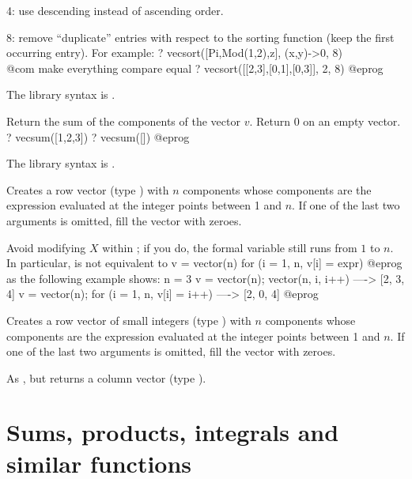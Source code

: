 \item 4: use descending instead of ascending order.

\item 8: remove ``duplicate'' entries with respect to the sorting function
(keep the first occurring entry).  For example:
\bprog
  ? vecsort([Pi,Mod(1,2),z], (x,y)->0, 8)   \\@com make everything compare equal
  ? vecsort([[2,3],[0,1],[0,3]], 2, 8)
@eprog

The library syntax is .

\label{se:vecsum}
Return the sum of the components of the vector $v$. Return $0$ on an
empty vector.
\bprog
? vecsum([1,2,3])
? vecsum([])
@eprog

The library syntax is .

\label{se:vector}
Creates a row vector (type
) with $n$ components whose components are the expression
 evaluated at the integer points between 1 and $n$. If one of the
last two arguments is omitted, fill the vector with zeroes.

Avoid modifying $X$ within ; if you do, the formal variable
still runs from $1$ to $n$. In particular,  is not
equivalent to
\bprog
v = vector(n)
for (i = 1, n, v[i] = expr)
@eprog\noindent
as the following example shows:
\bprog
n = 3
v = vector(n); vector(n, i, i++)            ----> [2, 3, 4]
v = vector(n); for (i = 1, n, v[i] = i++)   ----> [2, 0, 4]
@eprog\noindent

\label{se:vectorsmall}
Creates a row vector of small integers (type
) with $n$ components whose components are the expression
 evaluated at the integer points between 1 and $n$. If one of the
last two arguments is omitted, fill the vector with zeroes.

\label{se:vectorv}
As , but returns a column vector (type ).

\section{Sums, products, integrals and similar functions}
\label{se:sums}

